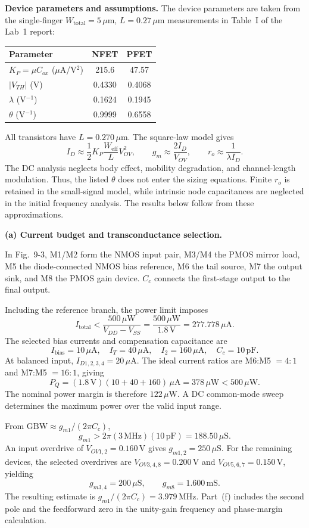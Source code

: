 \documentclass[12pt,letterpaper]{article}
\newcommand{\um}{\,\mu\mathrm{m}}
\newcommand{\uA}{\,\mu\mathrm{A}}
\newcommand{\uS}{\,\mu\mathrm{S}}
\newcommand{\uW}{\,\mu\mathrm{W}}
\newcommand{\mS}{\,\mathrm{mS}}
\newcommand{\V}{\,\mathrm{V}}
\newcommand{\MHz}{\,\mathrm{MHz}}
\newcommand{\pF}{\,\mathrm{pF}}
\begin{document}
\begin{enumerate}
\textbf{Device parameters and assumptions.}
The device parameters are taken from the single-finger
$W_{\mathrm{total}}=5\um$, $L=0.27\um$ measurements in
Table~I of the Lab~1 report:
\begin{center}
\small
\begin{tabular}{@{}lcc@{}}
\toprule
Parameter & NFET & PFET\\
\midrule
$K_P=\mu C_{ox}$ ($\mu$A/V$^2$) & 215.6 & 47.57\\
$|V_{TH}|$ (V) & 0.4330 & 0.4068\\
$\lambda$ (V$^{-1}$) & 0.1624 & 0.1945\\
$\theta$ (V$^{-1}$) & 0.9999 & 0.6558\\
\bottomrule
\end{tabular}
\end{center}
All transistors have $\boxed{L=0.270\um}$. The square-law model gives
\[
I_D\approx\frac12K_P\frac{W_{\mathrm{eff}}}{L}V_{OV}^2,\qquad
g_m\approx\frac{2I_D}{V_{OV}},\qquad
r_o\approx\frac{1}{\lambda I_D}.
\]
The DC analysis neglects body effect, mobility degradation, and
channel-length modulation. Thus, the listed $\theta$ does not enter
the sizing equations. Finite $r_o$ is retained in the small-signal
model, while intrinsic node capacitances are neglected in the
initial frequency analysis. The results below follow from these
approximations.

\newpage
\textbf{(a) Current budget and transconductance selection.}

In Fig.~9-3, M1/M2 form the NMOS input pair, M3/M4 the PMOS
mirror load, M5 the diode-connected NMOS bias reference, M6 the
tail source, M7 the output sink, and M8 the PMOS gain device.
$C_c$ connects the first-stage output to the final output.

Including the reference branch, the power limit imposes
\[
I_{\mathrm{total}}<
\frac{500\uW}{V_{DD}-V_{SS}}
=\frac{500\uW}{1.8\V}=277.778\uA.
\]
The selected bias currents and compensation capacitance are
\[
\boxed{I_{\mathrm{bias}}=10\uA,\quad I_T=40\uA,\quad I_2=160\uA,
\quad C_c=10\pF.}
\]
At balanced input, $I_{D1,2,3,4}=20\uA$. The ideal current
ratios are M6:M5 $=4:1$ and M7:M5 $=16:1$, giving
\[
P_Q=(1.8\V)(10+40+160)\uA
=\boxed{378\uW<500\uW}.
\]
The nominal power margin is therefore $122\uW$. A DC common-mode
sweep determines the maximum power over the valid input range.

From $\mathrm{GBW}\approx g_{m1}/(2\pi C_c)$,
\[
g_{m1}>2\pi(3\MHz)(10\pF)=188.50\uS.
\]
An input overdrive of $V_{OV1,2}=0.160\V$ gives
$g_{m1,2}=250\uS$. For the remaining devices, the selected
overdrives are $V_{OV3,4,8}=0.200\V$ and
$V_{OV5,6,7}=0.150\V$, yielding
\[
g_{m3,4}=200\uS,\qquad g_{m8}=1.600\mS.
\]
The resulting estimate is $g_{m1}/(2\pi C_c)=3.979\MHz$.
Part~(f) includes the second pole and the feedforward zero in the
unity-gain frequency and phase-margin calculation.


\end{enumerate}
\end{document}
